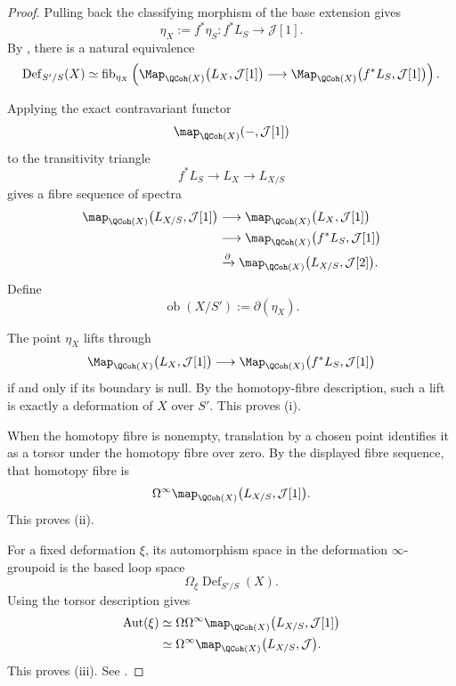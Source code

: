 \begin{proof}
Pulling back the classifying morphism of the base extension gives
\[
    \eta_X
    :=
    f^*\eta_S
    \colon
    f^*L_S
    \longrightarrow
    \mathcal J[1].
\]
By
,
there is a natural equivalence
\[
    \operatorname{Def}_{S'/S}(X)
    \simeq
    \operatorname{fib}_{\eta_X}
    \left(
        \Map_{\QCoh(X)}
        \bigl(
            L_X,
            \mathcal J[1]
        \bigr)
        \longrightarrow
        \Map_{\QCoh(X)}
        \bigl(
            f^*L_S,
            \mathcal J[1]
        \bigr)
    \right).
\]

Applying the exact contravariant functor
\[
    \map_{\QCoh(X)}(-,\mathcal J[1])
\]
to the transitivity triangle
\[
    f^*L_S
    \longrightarrow
    L_X
    \longrightarrow
    L_{X/S}
\]
gives a fibre sequence of spectra
\[
\begin{aligned}
    \map_{\QCoh(X)}
    \bigl(
        L_{X/S},
        \mathcal J[1]
    \bigr)
    &\longrightarrow
    \map_{\QCoh(X)}
    \bigl(
        L_X,
        \mathcal J[1]
    \bigr)
    \\
    &\longrightarrow
    \map_{\QCoh(X)}
    \bigl(
        f^*L_S,
        \mathcal J[1]
    \bigr)
    \\
    &\xrightarrow{\partial}
    \map_{\QCoh(X)}
    \bigl(
        L_{X/S},
        \mathcal J[2]
    \bigr).
\end{aligned}
\]
Define
\[
    \operatorname{ob}(X/S')
    :=
    \partial(\eta_X).
\]

The point \(\eta_X\) lifts through
\[
    \Map_{\QCoh(X)}
    \bigl(
        L_X,
        \mathcal J[1]
    \bigr)
    \longrightarrow
    \Map_{\QCoh(X)}
    \bigl(
        f^*L_S,
        \mathcal J[1]
    \bigr)
\]
if and only if its boundary is null. By the homotopy-fibre description,
such a lift is exactly a deformation of \(X\) over \(S'\). This proves
\textup{(i)}.

When the homotopy fibre is nonempty, translation by a chosen point
identifies it as a torsor under the homotopy fibre over zero. By the
displayed fibre sequence, that homotopy fibre is
\[
    \Omega^\infty
    \map_{\QCoh(X)}
    \bigl(
        L_{X/S},
        \mathcal J[1]
    \bigr).
\]
This proves \textup{(ii)}.

For a fixed deformation \(\xi\), its automorphism space in the
deformation $\infty$-groupoid is the based loop space
\[
    \Omega_\xi
    \operatorname{Def}_{S'/S}(X).
\]
Using the torsor description gives
\[
\begin{aligned}
    \operatorname{Aut}(\xi)
    &\simeq
    \Omega
    \Omega^\infty
    \map_{\QCoh(X)}
    \bigl(
        L_{X/S},
        \mathcal J[1]
    \bigr)
    \\
    &\simeq
    \Omega^\infty
    \map_{\QCoh(X)}
    \bigl(
        L_{X/S},
        \mathcal J
    \bigr).
\end{aligned}
\]
This proves \textup{(iii)}. See
\cite[Section~19.4.3]{LurieSAG}.
\end{proof}

